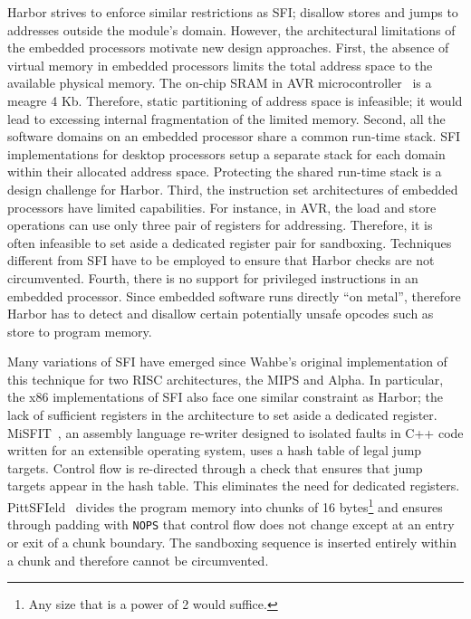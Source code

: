 Harbor strives to enforce similar restrictions as SFI; disallow
stores and jumps to addresses outside the module's domain.
%
However, the architectural limitations of the embedded processors
motivate new design approaches.
%
First, the absence of virtual memory in embedded processors limits the
total address space to the available physical memory.
%
The on-chip SRAM in AVR microcontroller~\cite{avrdatasheet} is a meagre 4 Kb.
%
Therefore, static partitioning of address space is infeasible; it
would lead to excessing internal fragmentation of the limited memory.
%
Second, all the software domains on an embedded processor share a
common run-time stack.
%
SFI implementations for desktop processors setup a separate stack for
each domain within their allocated address space.
%
Protecting the shared run-time stack is a design challenge for Harbor.
%
Third, the instruction set architectures of embedded processors have
limited capabilities.
%
For instance, in AVR, the load and store operations can use only three
pair of registers for addressing.
%
Therefore, it is often infeasible to set aside a dedicated register
pair for sandboxing.
%
Techniques different from SFI have to be employed to ensure that
Harbor checks are not circumvented.
%
Fourth, there is no support for privileged instructions in an embedded
processor.
%
Since embedded software runs directly ``on metal'', therefore Harbor
has to detect and disallow certain potentially unsafe opcodes such
as store to program memory.
%


Many variations of SFI have emerged since Wahbe's original
implementation of this technique for two RISC architectures, the MIPS
and Alpha.
%
In particular, the x86 implementations of SFI also face one similar
constraint as Harbor; the lack of sufficient registers in the
architecture to set aside a dedicated register.
%
MiSFIT~\cite{small97misfit}, an assembly language re-writer designed
to isolated faults in C++ code written for an extensible operating
system, uses a hash table of legal jump targets.
%
Control flow is re-directed through a check that ensures that jump
targets appear in the hash table.
%
This eliminates the need for dedicated registers.
%
PittSFIeld~\cite{pittsfield} divides the program memory into chunks of
16 bytes\footnote{Any size that is a power of 2 would suffice.} and
ensures through padding with \texttt{NOPS} that control flow does not
change except at an entry or exit of a chunk boundary.
%
The sandboxing sequence is inserted entirely within a chunk and
therefore cannot be circumvented.



